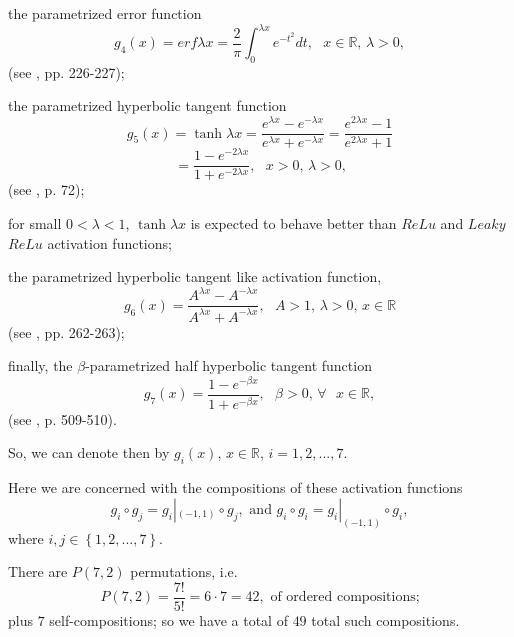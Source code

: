 \documentclass[10pt]{NSP1}
\numberwithin{equation}{section}
\begin{document}
the parametrized error function
\begin{equation}
g_{4}\left( x\right) =erf\lambda x=\frac{2}{\pi }\int_{0}^{\lambda
x}e^{-t^{2}}dt,\text{ \ }x\in \mathbb{R}\text{, }\lambda >0,  \tag{4}
\label{4.}
\end{equation}
(see \cite{7}, pp. 226-227);

the parametrized hyperbolic tangent function
\begin{equation*}
g_{5}\left( x\right) =\tanh \lambda x=\frac{e^{\lambda x}-e^{-\lambda x}}{
e^{\lambda x}+e^{-\lambda x}}=\frac{e^{2\lambda x}-1}{e^{2\lambda x}+1}
\end{equation*}
\begin{equation}
=\frac{1-e^{-2\lambda x}}{1+e^{-2\lambda x}},\text{ \ }x>0\text{, }\lambda >0
\text{,}  \tag{5}  \label{5.}
\end{equation}
(see \cite{7}, p. 72);

for small $0<\lambda <1$, $\tanh \lambda x$ is expected to behave better
than $ReLu$ and $Leaky$ $ReLu$ activation functions;

the parametrized hyperbolic tangent like activation function,
\begin{equation}
g_{6}\left( x\right) =\frac{A^{\lambda x}-A^{-\lambda x}}{A^{\lambda
x}+A^{-\lambda x}},\text{ \ }A>1\text{, }\lambda >0\text{, }x\in \mathbb{R}
\tag{6}  \label{6.}
\end{equation}
(see \cite{7}, pp. 262-263);

finally, the $\beta $-parametrized half hyperbolic tangent function
\begin{equation}
g_{7}\left( x\right) =\frac{1-e^{-\beta x}}{1+e^{-\beta x}},\text{ \ }\beta
>0\text{, }\forall \text{ }x\in \mathbb{R},  \tag{7}  \label{7.}
\end{equation}
(see \cite{7}, p. 509-510).

So, we can denote then by $g_{i}\left( x\right) $, $x\in \mathbb{R}$, $%
i=1,2,...,7.$

Here we are concerned with the compositions of these activation functions
\begin{equation}
g_{i}\circ g_{j}=g_{i}|_{\left( -1,1\right) }\circ g_{j},\text{ \ and }
g_{i}\circ g_{i}=g_{i}|_{\left( -1,1\right) }\circ g_{i},  \tag{8}
\label{8.}
\end{equation}
where $i,j\in \left \{ 1,2,...,7\right \} .$

There are $P\left( 7,2\right) $ permutations, i.e.
\begin{equation*}
P\left( 7,2\right) =\frac{7!}{5!}=6\cdot 7=42,\text{ of ordered compositions;
}
\end{equation*}
plus $7$ self-compositions; so we have a total of $49$ total such
compositions.
\end{document}
